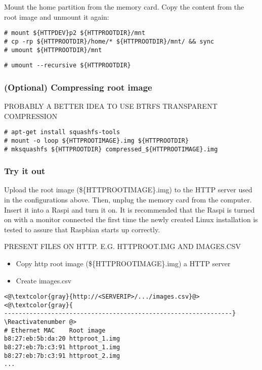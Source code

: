 Mount the home partition from the memory card. Copy the content from the
root image and unmount it again:
\begin{lstlisting}[]
# mount ${HTTPDEV}p2 ${HTTPROOTDIR}/mnt
# cp -rp ${HTTPROOTDIR}/home/* ${HTTPROOTDIR}/mnt/ && sync
# umount ${HTTPROOTDIR}/mnt
\end{lstlisting}
\FloatBarrier
\vspace{-5mm}


\begin{lstlisting}[]
# umount --recursive ${HTTPROOTDIR}
\end{lstlisting}
\FloatBarrier
\vspace{-5mm}


\subsubsection{(Optional) Compressing root image}

PROBABLY A BETTER IDEA TO USE BTRFS TRANSPARENT COMPRESSION

\begin{lstlisting}[]
# apt-get install squashfs-tools
# mount -o loop ${HTTPROOTIMAGE}.img ${HTTPROOTDIR}
# mksquashfs ${HTTPROOTDIR} compressed_${HTTPROOTIMAGE}.img
\end{lstlisting}
\FloatBarrier
\vspace{-5mm}

\subsubsection{Try it out}

Upload the root image (\$\{HTTPROOTIMAGE\}.img) to the HTTP server used in the
configurations above. Then, unplug the memory card from the computer.
Insert it into a \ac{Raspi} and
turn it on. It is recommended that the \ac{Raspi} is turned on with a monitor
connected the first time the newly created Linux installation is tested to
assure that Raspbian starts up correctly.


PRESENT FILES ON HTTP. E.G. HTTPROOT.IMG AND IMAGES.CSV


\begin{itemize}
    \item Copy http root image (\$\{HTTPROOTIMAGE\}.img) a HTTP server
    \item Create images.csv
\end{itemize}


\Suppressnumber\begin{lstlisting}[]
<@\textcolor{gray}{http://<SERVERIP>/.../images.csv}@>
<@\textcolor{gray}{
---------------------------------------------------------------}
\Reactivatenumber @>
# Ethernet MAC    Root image
b8:27:eb:5b:da:20 httproot_1.img
b8:27:eb:7b:c3:91 httproot_1.img
b8:27:eb:7b:c3:91 httproot_2.img
...
\end{lstlisting}
\FloatBarrier
\vspace{-5mm}

